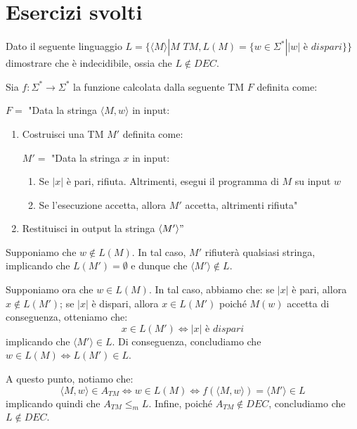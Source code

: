 \section{Esercizi svolti}
\begin{Exercise}{}{}
Dato il seguente linguaggio $L = \{\langle M\rangle | M\textit{ TM}, L(M) = \{w \in\Sigma^*| |w|\textit{ è dispari}\}\}$ dimostrare che è indecidibile, ossia che $L \notin  DEC$.

\begin{demonstration}
Sia $f : \Sigma^*\rightarrow\Sigma^*$ la funzione calcolata dalla seguente TM $F$ definita come:

$F =$ "Data la stringa $\langle M, w\rangle$ in input:
\begin{enumerate}
    \item Costruisci una TM $M'$ definita come:

    $M' =$ "Data la stringa $x$ in input:
    \begin{enumerate}
        \item Se $|x|$ è pari, rifiuta. Altrimenti, esegui il programma di $M$ su input $w$
        \item Se l’esecuzione accetta, allora $M'$ accetta, altrimenti rifiuta"
    \end{enumerate}
    \item Restituisci in output la stringa $\langle M'\rangle"$
\end{enumerate}
Supponiamo che $w \notin L(M)$. In tal caso, $M'$ rifiuterà qualsiasi stringa, implicando che $L(M'
) = \emptyset$ e dunque che $\langle M' \rangle \notin  L$.

Supponiamo ora che $w \in  L(M)$. In tal caso, abbiamo che: se $|x|$ è pari, allora $x \notin  L(M'
)$; se $|x|$ è dispari, allora $x \in  L(M')$ poiché $M(w)$ accetta di conseguenza, otteniamo che:
\begin{equation*}
x \in  L(M') \iff |x|\textit{ è dispari}
\end{equation*}
implicando che $\langle M' \rangle \in  L$. Di conseguenza, concludiamo che $w \in  L(M) \iff L(M') \in  L$.

A questo punto, notiamo che:
\begin{equation*}
\langle M, w\rangle \in A_{TM} \iff w \in  L(M) \iff f(\langle M, w\rangle) = \langle M'\rangle \in  L
\end{equation*}
implicando quindi che $A_{TM} \leq_m L$. Infine, poiché $A_{TM} \notin  DEC$, concludiamo che $L \notin  DEC$.
\end{demonstration}
\end{Exercise}

